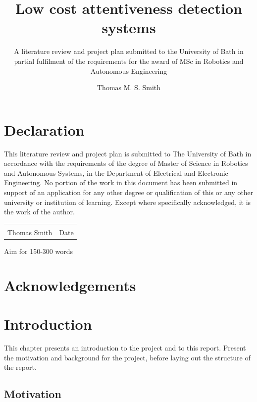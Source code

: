 \documentclass[11pt, parskip=half*,twoside=false]{scrbook}
\title{Low cost attentiveness detection systems}
\author{Thomas M. S. Smith}
\subtitle{A literature review and project plan submitted to the University of Bath in partial fulfilment of the requirements for the award of MSc in Robotics and Autonomous Engineering}
\begin{document}
\maketitle

\frontmatter

\chapter*{Declaration}

This literature review and project plan is submitted to The University of Bath in accordance with the requirements of the degree of Master of Science in Robotics and Autonomous Systems, in the Department of Electrical and Electronic Engineering. No portion of the work in this document has been submitted in support of an application for any other degree or qualification of this or any other university or institution of learning. Except where specifically acknowledged, it is the work of the author.

\vskip 2cm
\noindent\begin{tabular}{@{}p{}p{}@{}}
	\dotfill                         & \dotfill\\
	Thomas Smith              & Date\\
\end{tabular} 


Aim for 150-300 words


\tableofcontents

\printnoidxglossary[sort=letter, title={List of Abbreviations}]

\chapter*{Acknowledgements}


\mainmatter


\chapter{Introduction} \label{ch:intro}
This chapter presents an introduction to the project and to this report. Present the motivation and background for the project, before laying out the structure of the report.  

\section{Motivation} \label{sec:motive}
\end{document}
